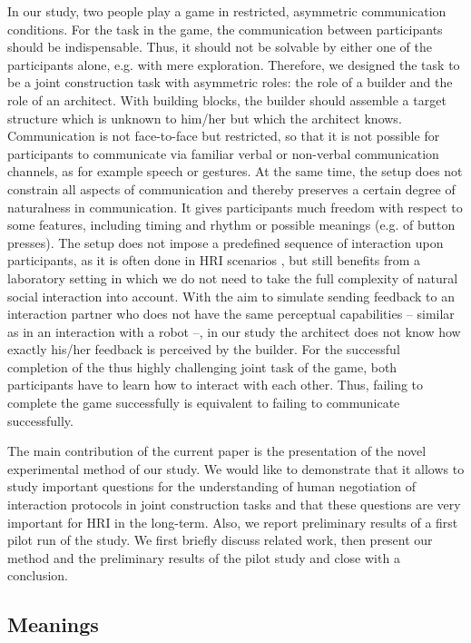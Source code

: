 {In our study, two people play a game in restricted, asymmetric communication conditions. For the task in the game, the communication between participants should be indispensable. Thus, it should not be solvable by either one of the participants alone, e.g. with mere exploration. Therefore, we designed the task to be a joint construction task with asymmetric roles: the role of a builder and the role of an architect. With building blocks, the builder should assemble a target structure which is unknown to him/her but which the architect knows. 
Communication is not face-to-face but restricted, so that it is not possible for participants to communicate via familiar verbal or non-verbal communication channels, as for example speech or gestures. At the same time, the setup does not constrain all aspects of communication and thereby preserves a certain degree of naturalness in communication. It gives participants much freedom with respect to some features, including timing and rhythm or possible meanings (e.g. of button presses). The setup does not impose a predefined sequence of interaction upon participants, as it is often done in HRI scenarios \cite{akgun12hri}, but still benefits from a laboratory setting in which we do not need to take the full complexity of natural social interaction into account. With the aim to simulate sending feedback to an interaction partner who does not have the same perceptual capabilities -- similar as in an interaction with a robot --, in our study the architect does not know how exactly his/her feedback is perceived by the builder. For the successful completion of the thus highly challenging joint task of the game, both participants have to learn how to interact with each other. Thus, failing to complete the game successfully is equivalent to failing to communicate successfully.


The main contribution of the current paper is the presentation of the novel experimental method of our study. We would like to demonstrate that it allows to study important questions for the understanding of human negotiation of interaction protocols in joint construction tasks and that these questions are very important for HRI in the long-term. Also, we report preliminary results of a first pilot run of the study. We first briefly discuss related work, then present our method and the preliminary results of the pilot study and close with a conclusion.



\subsection{Meanings}

}
